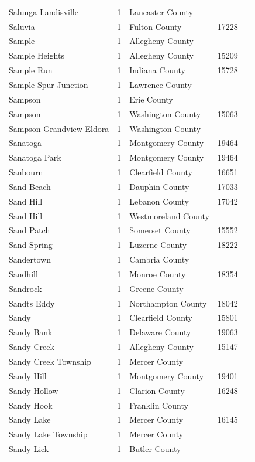 \documentclass{article}
\begin{document}
\begin{tabular}{lllll}
Salunga-Landisville & 1 & Lancaster County &  &  \\
Saluvia & 1 & Fulton County & 17228 &  \\
Sample & 1 & Allegheny County &  &  \\
Sample Heights & 1 & Allegheny County & 15209 &  \\
Sample Run & 1 & Indiana County & 15728 &  \\
Sample Spur Junction & 1 & Lawrence County &  &  \\
Sampson & 1 & Erie County &  &  \\
Sampson & 1 & Washington County & 15063 &  \\
Sampson-Grandview-Eldora & 1 & Washington County &  &  \\
Sanatoga & 1 & Montgomery County & 19464 &  \\
Sanatoga Park & 1 & Montgomery County & 19464 &  \\
Sanbourn & 1 & Clearfield County & 16651 &  \\
Sand Beach & 1 & Dauphin County & 17033 &  \\
Sand Hill & 1 & Lebanon County & 17042 &  \\
Sand Hill & 1 & Westmoreland County &  &  \\
Sand Patch & 1 & Somerset County & 15552 &  \\
Sand Spring & 1 & Luzerne County & 18222 &  \\
Sandertown & 1 & Cambria County &  &  \\
Sandhill & 1 & Monroe County & 18354 &  \\
Sandrock & 1 & Greene County &  &  \\
Sandts Eddy & 1 & Northampton County & 18042 &  \\
Sandy & 1 & Clearfield County & 15801 &  \\
Sandy Bank & 1 & Delaware County & 19063 &  \\
Sandy Creek & 1 & Allegheny County & 15147 &  \\
Sandy Creek Township & 1 & Mercer County &  &  \\
Sandy Hill & 1 & Montgomery County & 19401 &  \\
Sandy Hollow & 1 & Clarion County & 16248 &  \\
Sandy Hook & 1 & Franklin County &  &  \\
Sandy Lake & 1 & Mercer County & 16145 &  \\
Sandy Lake Township & 1 & Mercer County &  &  \\
Sandy Lick & 1 & Butler County &  &  \\

\end{tabular}
\end{document}
